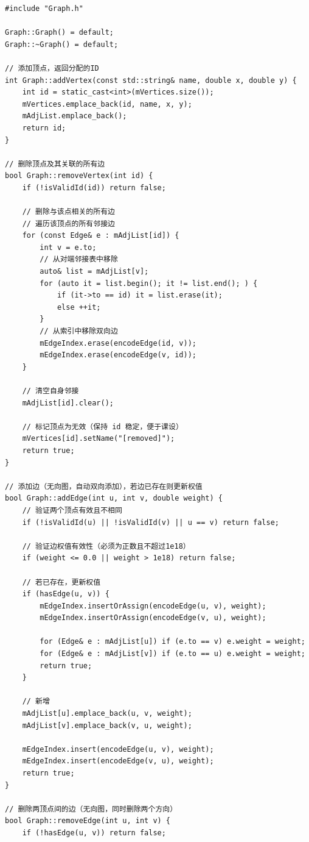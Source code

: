 \documentclass[UTF8,12pt,a4paper]{ctexart}
\begin{document}
\begin{lstlisting}[caption={Graph.cpp 源码}]
#include "Graph.h"

Graph::Graph() = default;
Graph::~Graph() = default;

// 添加顶点，返回分配的ID
int Graph::addVertex(const std::string& name, double x, double y) {
    int id = static_cast<int>(mVertices.size());
    mVertices.emplace_back(id, name, x, y);
    mAdjList.emplace_back();
    return id;
}

// 删除顶点及其关联的所有边
bool Graph::removeVertex(int id) {
    if (!isValidId(id)) return false;

    // 删除与该点相关的所有边
    // 遍历该顶点的所有邻接边
    for (const Edge& e : mAdjList[id]) {
        int v = e.to;
        // 从对端邻接表中移除
        auto& list = mAdjList[v];
        for (auto it = list.begin(); it != list.end(); ) {
            if (it->to == id) it = list.erase(it);
            else ++it;
        }
        // 从索引中移除双向边
        mEdgeIndex.erase(encodeEdge(id, v));
        mEdgeIndex.erase(encodeEdge(v, id));
    }

    // 清空自身邻接
    mAdjList[id].clear();

    // 标记顶点为无效（保持 id 稳定，便于课设）
    mVertices[id].setName("[removed]");
    return true;
}

// 添加边（无向图，自动双向添加），若边已存在则更新权值
bool Graph::addEdge(int u, int v, double weight) {
    // 验证两个顶点有效且不相同
    if (!isValidId(u) || !isValidId(v) || u == v) return false;

    // 验证边权值有效性（必须为正数且不超过1e18）
    if (weight <= 0.0 || weight > 1e18) return false;

    // 若已存在，更新权值
    if (hasEdge(u, v)) {
        mEdgeIndex.insertOrAssign(encodeEdge(u, v), weight);
        mEdgeIndex.insertOrAssign(encodeEdge(v, u), weight);

        for (Edge& e : mAdjList[u]) if (e.to == v) e.weight = weight;
        for (Edge& e : mAdjList[v]) if (e.to == u) e.weight = weight;
        return true;
    }

    // 新增
    mAdjList[u].emplace_back(u, v, weight);
    mAdjList[v].emplace_back(v, u, weight);

    mEdgeIndex.insert(encodeEdge(u, v), weight);
    mEdgeIndex.insert(encodeEdge(v, u), weight);
    return true;
}

// 删除两顶点间的边（无向图，同时删除两个方向）
bool Graph::removeEdge(int u, int v) {
    if (!hasEdge(u, v)) return false;


\end{lstlisting}
\end{document}
